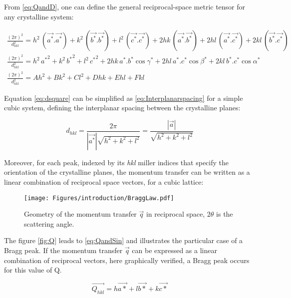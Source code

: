 From \eqref{eq:QandD}, one can define the general reciprocal-space metric tensor for any crystalline system:

\begin{gather}
    \frac{(2\pi)^2}{d_{hkl}^2} = h^2 \, (\Vec{a^*}.\Vec{a^*}) + k^2 \,
    \label{eq:dsquare}(\Vec{b^*}.\Vec{b^*}) + l^2 \, (\Vec{c^*}.\Vec{c^*}) + 2hk \, (\Vec{a^*}.\Vec{b^*}) + 2hl \, (\Vec{a^*}.\Vec{c^*}) + 2kl \, (\Vec{b^*}.\Vec{c^*})\\
     \frac{(2\pi)^2}{d_{hkl}^2} = h^2 \, {a^*}^2 + k^2 \, {b^*}^2 + l^2 \, {c^*}^2 + 2hk \, {a^*}.{b^*}\cos{\gamma^*} + 2hl \, {a^*}.{c^*}\cos{\beta^*} + 2kl \, {b^*}.{c^*}\cos{\alpha^*}\\
     \frac{(2\pi)^2}{d_{hkl}^2} = Ah^2 + Bk^2 + Cl^2 + Dhk + Ehl + Fkl
     \label{eq:RecSpaceMetricTensor}
\end{gather}{}

Equation \eqref{eq:dsquare} can be simplified as \eqref{eq:Interplanarspacing} for a simple cubic system, defining the interplanar spacing between the crystalline planes:

\begin{equation}
    \label{eq:Interplanarspacing}
    d_{hkl}=\frac{2\pi}{|\vec{a^*}|\sqrt{h^2 + k^2 + l^2}}=\frac{|\vec{a}|}{\sqrt{h^2 + k^2 + l^2}}
\end{equation}{}

Moreover, for each peak, indexed by its \textit{hkl} miller indices that specify the orientation of the crystalline planes, the momentum transfer can be written as a linear combination of reciprocal space vectors, for a cubic lattice:

\begin{figure}[H]
    \centering
    \texttt{[image: Figures/introduction/BraggLaw.pdf]}
    \caption{Geometry of the momentum transfer $\vec{q}$ in reciprocal space, $2\theta$ is the scattering angle.}
    \label{fig:BraggLaw}
\end{figure}

The figure \ref{fig:Q} leads to \eqref{eq:QandSin} and illustrates the particular case of a Bragg peak. If the momentum transfer $\vec{q}$ can be expressed as a linear combination of reciprocal vectors, here graphically verified, a Bragg peak occurs for this value of Q.

\begin{equation}
    \label{eq:Qhkl}
    \vec{Q_{hkl}} = h\vec{a*} + l\vec{b*} + k\vec{c*}
\end{equation}{}

